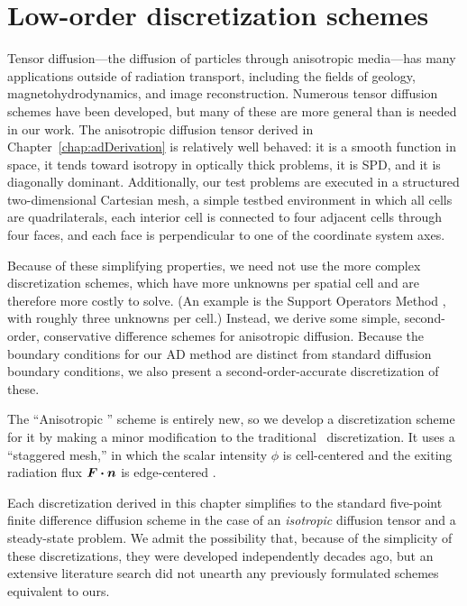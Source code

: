 
\chapter{Low-order discretization schemes} \label{chap:implementation}

Tensor diffusion---the diffusion of particles through anisotropic media---has
many applications outside of radiation transport, including the fields of geology,
magnetohydrodynamics, and image reconstruction. Numerous tensor diffusion
schemes have been developed, but many of these are more general than is needed
in our work. The anisotropic diffusion tensor derived in
Chapter~\ref{chap:adDerivation} is relatively well behaved: it is a smooth
function in space, it tends toward isotropy in optically thick problems, it is
SPD, and it is diagonally dominant. Additionally, our test problems
are executed in a structured
two-dimensional Cartesian mesh, a simple testbed environment in which all cells
are
quadrilaterals, each interior cell is connected to four adjacent cells through
four faces, and each face is
perpendicular to one of the coordinate system axes.

Because of these simplifying properties, we need not use the more
complex discretization schemes, which have more unknowns
per spatial cell and are therefore more costly to solve.
(An example is the Support Operators Method \cite{Mor1998,Run2006}, with
roughly three unknowns per cell.) Instead, we derive some simple, second-order,
conservative
difference schemes for anisotropic diffusion. Because the
boundary conditions for our AD method are distinct from standard diffusion
boundary conditions, we also present a second-order-accurate discretization of
these.

The ``Anisotropic \Pone'' scheme is entirely new, so we develop a discretization
scheme for it by making a minor modification to the traditional \Pone\
discretization. It uses a ``staggered mesh,'' in which the scalar intensity
$\phi$ is cell-centered and the exiting radiation flux $\bm{F}\bm{\cdot} \bm{n}$ is
edge-centered \cite{War2003}.

Each discretization derived in this chapter simplifies to the standard
five-point finite difference diffusion scheme in the case of an
\emph{isotropic} diffusion tensor and a steady-state problem. We admit the
possibility that, because of the simplicity of these discretizations, they were
developed independently decades ago, but an extensive literature search did not
unearth any previously formulated schemes equivalent to ours.

